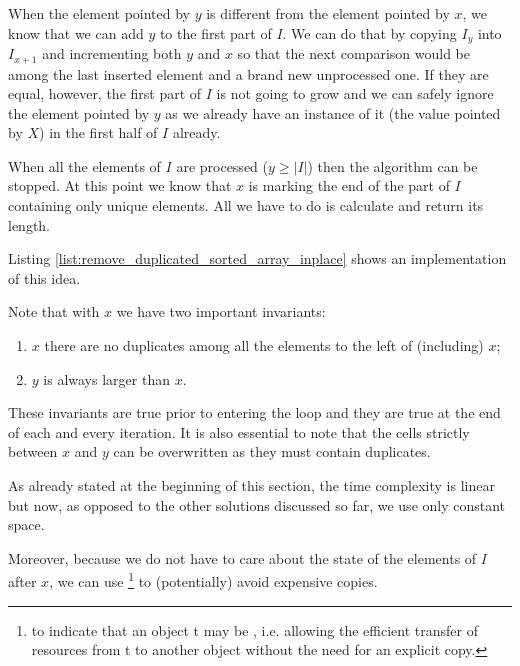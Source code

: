 When the element pointed by $y$ is different from the element pointed by $x$, we know that we can add
$y$ to the first part of $I$. We can do that by copying $I_y$ into $I_{x+1}$ and incrementing both
$y$ and $x$ so that the next comparison would be among the last inserted element and a brand new unprocessed one.
If they are equal, however, the first part of $I$ is not going to grow and we can
safely ignore the element pointed by $y$ as we already have an instance of it (the value pointed by $X$) in the first half of $I$ already.

When all the elements of $I$ are processed ($y \geq |I|$) then the algorithm can be stopped. 
At this point
we know that $x$ is marking the end of the part of $I$ containing only unique elements. 
All we have to do is calculate and return its length. 

Listing \ref{list:remove_duplicated_sorted_array_inplace} shows an implementation of this idea.




Note that with $x$ we have two important invariants:
\begin{enumerate}
	\item $x$ there are no duplicates among all the elements to the left of (including) $x$;
	\item $y$ is always larger than $x$.
\end{enumerate}

These invariants are true prior to entering the  loop and they are true at the end of each and every iteration. It is also essential to note that the cells strictly between $x$ and $y$ can be overwritten as they must contain duplicates.

As already stated at the beginning of this section, the time complexity is linear but now, as opposed to the other solutions discussed so far, we use only constant space. 

Moreover, because we do not have to care about the state of the elements of $I$ after $x$,
we can use \href{https://en.cppreference.com/w/cpp/utility/move}{}\footnote{ to indicate that an object t may be , i.e. allowing the efficient transfer of resources from t to another object without the need for an explicit copy.} to (potentially) avoid expensive copies.

